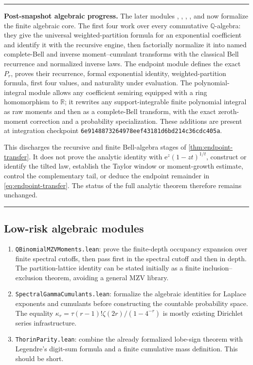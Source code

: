 \documentclass[11pt,oneside]{article}
\theoremstyle{definition}
\theoremstyle{remark}
\newcommand{\e}{\mathrm e}
\newenvironment{boxedremark}{%
  \par\smallskip\noindent\begin{center}\begin{minipage}{0.94\textwidth}%
  \color{black}\hrule\vspace{0.6em}\small
}{%
  \vspace{0.6em}\hrule\end{minipage}\end{center}\smallskip
}
\begin{document}
\begin{boxedremark}
\textbf{Post-snapshot algebraic progress.}
The later modules ,
, ,
, and
 now formalize the finite algebraic
core.  The first four work over every commutative \(\mathbb Q\)-algebra: they
give the universal weighted-partition formula for an exponential coefficient
and identify it with the recursive
 engine, then factorially normalize it
into named complete-Bell and inverse moment--cumulant transforms with the
classical Bell recurrence and normalized inverse laws.  The endpoint module
defines the exact \(P_r\), proves their recurrence, formal exponential identity,
weighted-partition formula, first four values, and naturality under evaluation.
The polynomial-integral module allows any coefficient semiring equipped with
a ring homomorphism to \(\mathbb R\); it rewrites any support-integrable finite
polynomial integral as raw moments and then as a complete-Bell transform, with
the exact zeroth-moment correction and a probability specialization.  These additions are
present at integration checkpoint
\texttt{6e9148873264978eef43181d6bd214c36cdc405a}.

This discharges the recursive and finite Bell-algebra stages of
\cref{thm:endpoint-transfer}.  It does not prove the analytic identity with
\(\e^z(1-zt)^{1/t}\), construct or identify the tilted law, establish the
Taylor window or moment-growth estimate, control the complementary tail, or
deduce the endpoint remainder in \eqref{eq:endpoint-transfer}.  The status of
the full analytic theorem therefore remains unchanged.
\end{boxedremark}

\subsection{Low-risk algebraic modules}

\begin{enumerate}
\item \texttt{QBinomialMZVMoments.lean}: prove the finite-depth occupancy
      expansion over finite spectral cutoffs, then pass first in the spectral
      cutoff and then in depth.  The partition-lattice identity can be stated
      initially as a finite inclusion--exclusion theorem, avoiding a general
      MZV library.
\item \texttt{SpectralGammaCumulants.lean}: formalize the algebraic identities
      for Laplace exponents and cumulants before constructing the countable
      probability space.  The equality
      $\kappa_r=\tau(r-1)!\zeta(2r)/(1-4^{-r})$ is mostly existing Dirichlet
      series infrastructure.
\item \texttt{ThorinParity.lean}: combine the already formalized lobe-sign
      theorem with Legendre's digit-sum formula and a finite cumulative mass
      definition.  This should be short.
\end{enumerate}
\end{document}
